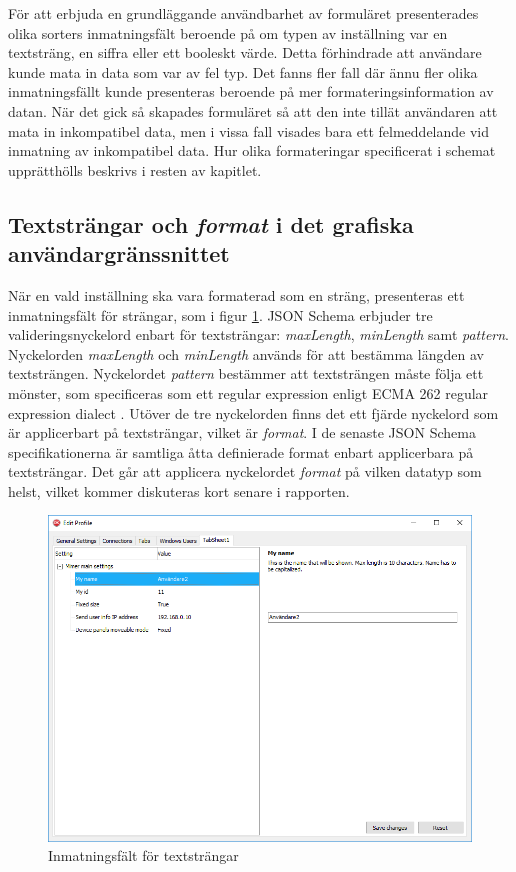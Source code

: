 För att erbjuda en grundläggande användbarhet av formuläret presenterades olika sorters inmatningsfält beroende på om typen av inställning var en textsträng, en siffra eller ett booleskt värde. Detta förhindrade att användare kunde mata in data som var av fel typ. Det fanns fler fall där ännu fler olika inmatningsfällt kunde presenteras beroende på mer formateringsinformation av datan. När det gick så skapades formuläret så att den inte tillät användaren att mata in inkompatibel data, men i vissa fall visades bara ett felmeddelande vid inmatning av inkompatibel data. Hur olika formateringar specificerat i schemat upprätthölls beskrivs i resten av kapitlet.

\subsection{Textsträngar och \textit{format} i det grafiska användargränssnittet}

När en vald inställning ska vara formaterad som en sträng, presenteras ett inmatningsfält för strängar, som i figur \ref{fig:textstrang}. JSON Schema erbjuder tre valideringsnyckelord enbart för textsträngar: \textit{maxLength}, \textit{minLength} samt \textit{pattern}. Nyckelorden \textit{maxLength} och \textit{minLength} används för att bestämma längden av textsträngen. Nyckelordet \textit{pattern} bestämmer att textsträngen måste följa ett mönster, som specificeras som ett regular expression enligt ECMA 262 regular expression dialect \cite{EcmaInternational2017}. Utöver de tre nyckelorden finns det ett fjärde nyckelord som är applicerbart på textsträngar, vilket är \textit{format}. I de senaste JSON Schema specifikationerna är samtliga åtta definierade format enbart applicerbara på textsträngar. Det går att applicera nyckelordet \textit{format} på vilken datatyp som helst, vilket kommer diskuteras kort senare i rapporten. \cite{Andrews}

\begin{figure}
	\includegraphics[width=\textwidth]{./images/gui/textstrang.png}
	\vspace{-1.7em}
	\caption{Inmatningsfält för textsträngar}
	\label{fig:textstrang}
\end{figure}

